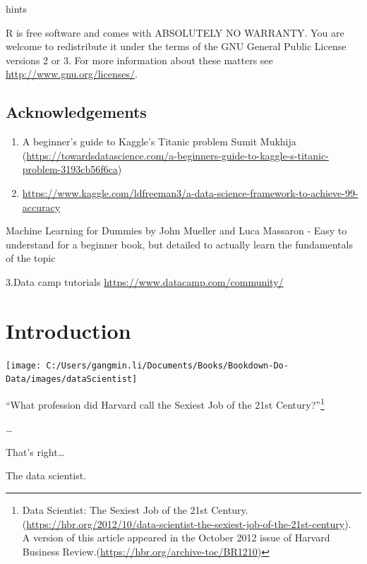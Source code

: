 \documentclass[
]{book}
\makeatletter
\newenvironment{kframe}{%
\medskip{}
\setlength{\fboxsep}{.8em}
 \def\at@end@of@kframe{}%
 \ifinner\ifhmode%
  \def\at@end@of@kframe{\end{minipage}}%
  \begin{minipage}{\columnwidth}%
 \fi\fi%
 \def\FrameCommand##1{\hskip\@totalleftmargin \hskip-\fboxsep
 \colorbox{shadecolor}{##1}\hskip-\fboxsep
     \hskip-\linewidth \hskip-\@totalleftmargin \hskip\columnwidth}%
 \MakeFramed {\advance\hsize-\width
   \@totalleftmargin\z@ \linewidth\hsize
   \@setminipage}}%
 {\par\unskip\endMakeFramed%
 \at@end@of@kframe}
\newenvironment{rmdblock}[1]
  {
  \begin{itemize}
  \renewcommand{\labelitemi}{
    \raisebox{-.7\height}[0pt][0pt]{
      {\setkeys{Gin}{width=3em,keepaspectratio}\texttt{[image: images/\#1]}}
    }
  }
  \setlength{\fboxsep}{1em}
  \begin{kframe}
  \item
  }
  {
  \end{kframe}
  \end{itemize}
  }
\newenvironment{rmdnote}
  {\begin{rmdblock}{note}}
  {\end{rmdblock}}
\makeatother
\begin{document}
hints

\begin{rmdnote}
R is free software and comes with ABSOLUTELY NO WARRANTY.
You are welcome to redistribute it under the terms of the
GNU General Public License versions 2 or 3.
For more information about these matters see
\url{http://www.gnu.org/licenses/}.
\end{rmdnote}

\hypertarget{acknowledgements}{%
\section*{Acknowledgements}\label{acknowledgements}}


\begin{enumerate}
\def\labelenumi{\arabic{enumi}.}
\item
  A beginner's guide to Kaggle's Titanic problem
  Sumit Mukhija (\url{https://towardsdatascience.com/a-beginners-guide-to-kaggle-s-titanic-problem-3193cb56f6ca})
\item
  \url{https://www.kaggle.com/ldfreeman3/a-data-science-framework-to-achieve-99-accuracy}
\end{enumerate}

Machine Learning for Dummies by John Mueller and Luca Massaron - Easy to understand for a beginner book, but detailed to actually learn the fundamentals of the topic

3.Data camp tutorials
\url{https://www.datacamp.com/community/}

\hypertarget{intro}{%
\chapter{Introduction}\label{intro}}

\begin{center}\texttt{[image: C:/Users/gangmin.li/Documents/Books/Bookdown-Do-Data/images/dataScientist]} \end{center}

\begin{rmdnote}
``What profession did Harvard call the Sexiest Job of the 21st Century?''\footnote{Data Scientist: The Sexiest Job of the 21st Century. (\url{https://hbr.org/2012/10/data-scientist-the-sexiest-job-of-the-21st-century}). A version of this article appeared in the October 2012 issue of Harvard Business Review.(\url{https://hbr.org/archive-toc/BR1210}) }

\ldots{}

That's right\ldots{}

The data scientist.
\end{rmdnote}
\end{document}
